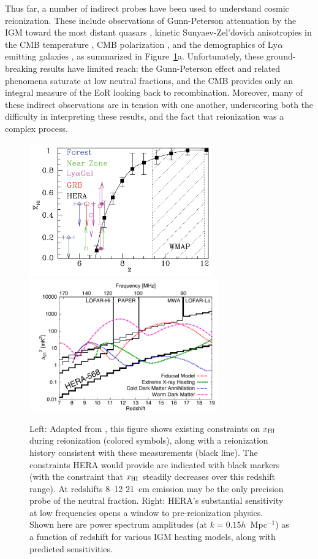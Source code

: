 \documentclass[preprint]{aastex}
\def\HI{{H{\small I }}}
\def\xHI{{x_{\rm\HI}}}
\begin{document}
Thus far, a number of indirect probes have been used to understand cosmic
reionization.  These include observations of Gunn-Peterson attenuation by the
IGM toward the most distant quasars \citep{fan_et_al2006},
kinetic Sunyaev-Zel'dovich anisotropies in the CMB temperature \citep{zahn_et_al2012_trunc}, CMB
polarization \citep{page_et_al2007,planck_et_al2013}, and the
demographics of Ly$\alpha$ emitting galaxies
\citep{treu_et_al2013}, as summarized in Figure~\ref{fig:x_i_Xray}a.  Unfortunately,
these ground-breaking results have limited reach: the
Gunn-Peterson effect and related phenomena saturate at low neutral fractions,
and the CMB provides only an integral measure of %
the EoR looking %
back to recombination.  Moreover, many of these indirect observations are in
tension with one another, underscoring both the difficulty in interpreting
these results, and the fact that reionization was a complex process.


\begin{figure}[t]\centering
\includegraphics[height=2.25in]{plots/constraints_crop.pdf}  %
\includegraphics[height=2.25in]{plots/Xray.pdf} 
\caption{\small 
Left: Adapted from \citet{robertson_2013}, this figure shows existing
constraints on $\xHI$ during reionization (colored symbols), along with a
reionization history consistent with these measurements (black line). The
constraints HERA would provide are indicated with black markers (with the constraint
that $\xHI$ steadily decreases over this redshift range). At redshifts 8--12
21~cm emission may be the only precision probe of the neutral fraction.  
Right: HERA’s substantial sensitivity at low frequencies opens a window to
pre-reionization physics. Shown here are power spectrum amplitudes (at $k =
0.15h$~Mpc$^{-1}$) as a function of redshift for various IGM heating models,
along with predicted sensitivities.
}\label{fig:x_i_Xray} \end{figure}
\end{document}
